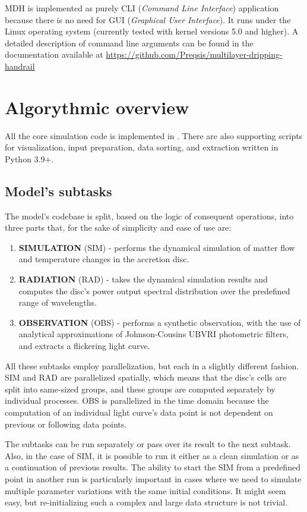     MDH is implemented as purely CLI (\emph{Command Line Interface}) application because there is no need for GUI (\emph{Graphical User Interface}). It runs under the Linux operating system (currently tested with kernel versions 5.0 and higher). A detailed description of command line arguments can be found in the documentation available at \url{https://github.com/Preqsis/multilayer-dripping-handrail}

\section{Algorythmic overview}
    All the core simulation code is implemented in \CC. There are also supporting scripts for visualization, input preparation, data sorting, and extraction written in Python 3.9+.  

\subsection{Model's subtasks}
    The model's codebase is split, based on the logic of consequent operations, into three parts that, for the sake of simplicity and ease of use are:

    \begin{enumerate}[topsep=4mm]
        \item \textbf{SIMULATION} (SIM) - performs the dynamical simulation of matter flow and temperature changes in the accretion disc.
        \item \textbf{RADIATION} (RAD) - takes the dynamical simulation results and computes the disc's power output spectral distribution over the predefined range of wavelengths.
        \item \textbf{OBSERVATION} (OBS) - performs a synthetic observation, with the use of analytical approximations of Johnson-Cousins $\mathrm{UBVRI}$ photometric filters, and extracts a flickering light curve.  
    \end{enumerate}

    All these subtasks employ parallelization, but each in a slightly different fashion. SIM and RAD are parallelized spatially, which means that the disc's cells are split into same-sized groups, and these groups are computed separately by individual processes. OBS is parallelized in the time domain because the computation of an individual light curve's data point is not dependent on previous or following data points. 

    The subtasks can be run separately or pass over its result to the next subtask. Also, in the case of SIM, it is possible to run it either as a clean simulation or as a continuation of previous results. The ability to start the SIM from a predefined point in another run is particularly important in cases where we need to simulate multiple parameter variations with the same initial conditions. It might seem easy, but re-initializing such a complex and large data structure is not trivial. 

